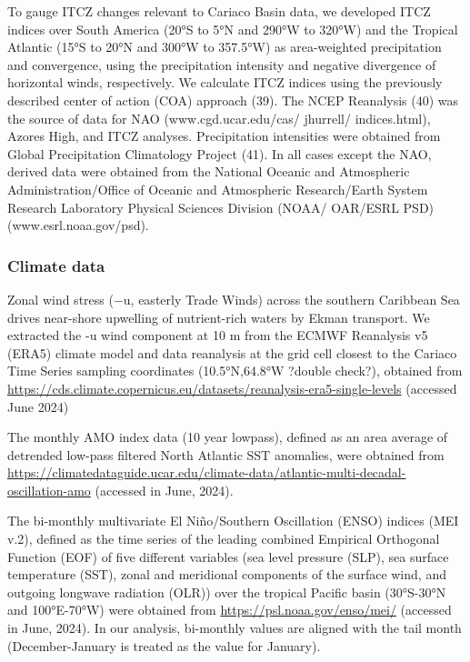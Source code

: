 \documentclass[draft]{agujournal2019}
\begin{document}
    To gauge ITCZ changes relevant to Cariaco Basin data, we developed ITCZ indices over South America (20°S to 5°N and 290°W to 320°W) and the Tropical Atlantic (15°S to 20°N and 300°W to 357.5°W) as area-weighted precipitation and convergence, using the precipitation intensity and negative divergence of horizontal winds, respectively. We calculate ITCZ indices using the previously described center of action (COA) approach (39). The NCEP Reanalysis (40) was the source of data for NAO (www.cgd.ucar.edu/cas/ jhurrell/ indices.html), Azores High, and ITCZ analyses. Precipitation intensities were obtained from Global Precipitation Climatology Project (41). In all cases except the NAO, derived data were obtained from the National Oceanic and Atmospheric Administration/Office of Oceanic and Atmospheric Research/Earth System Research Laboratory Physical Sciences Division (NOAA/ OAR/ESRL PSD) (www.esrl.noaa.gov/psd). 

    \subsubsection{Climate data}
    Zonal wind stress (−u, easterly Trade Winds) across the southern Caribbean Sea drives near-shore upwelling of nutrient-rich waters by Ekman transport. We extracted the -u wind component at 10 m from the ECMWF Reanalysis v5 (ERA5) climate model and data reanalysis at the grid cell closest to the Cariaco Time Series sampling coordinates (10.5°N,64.8°W ?double check?), obtained from \url{https://cds.climate.copernicus.eu/datasets/reanalysis-era5-single-levels} (accessed June 2024)
    
    The monthly AMO index data (10 year lowpass), defined as an area average of detrended low-pass filtered North Atlantic SST anomalies, were obtained from \url{https://climatedataguide.ucar.edu/climate-data/atlantic-multi-decadal-oscillation-amo} (accessed in June, 2024).
    
    The bi-monthly multivariate El Niño/Southern Oscillation (ENSO) indices (MEI v.2), defined as the time series of the leading combined Empirical Orthogonal Function (EOF) of five different variables (sea level pressure (SLP), sea surface temperature (SST), zonal and meridional components of the surface wind, and outgoing longwave radiation (OLR)) over the tropical Pacific basin (30°S-30°N and 100°E-70°W) were obtained from \url{https://psl.noaa.gov/enso/mei/} (accessed in June, 2024). In our analysis, bi-monthly values are aligned with the tail month (December-January is treated as the value for January).
    
\end{document}
